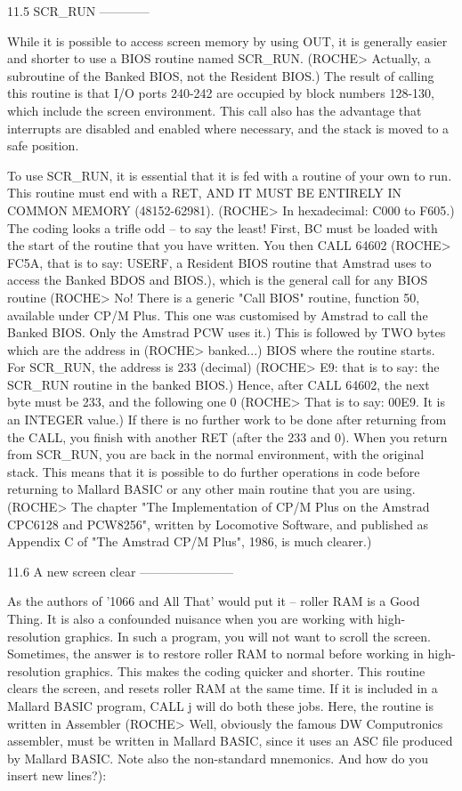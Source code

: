 11.5 SCR_RUN
------------

While  it  is possible to access screen memory by using OUT, it  is  generally 
easier  and shorter to use a BIOS routine named SCR_RUN. (ROCHE>  Actually,  a 
subroutine  of the Banked BIOS, not the Resident BIOS.) The result of  calling 
this routine is that I/O ports 240-242 are occupied by block numbers  128-130, 
which  include the screen environment. This call also has the  advantage  that 
interrupts are disabled and enabled where necessary, and the stack is moved to 
a safe position.

To  use SCR_RUN, it is essential that it is fed with a routine of your own  to 
run.  This  routine  must end with a RET, AND IT MUST BE  ENTIRELY  IN  COMMON 
MEMORY (48152-62981). (ROCHE> In hexadecimal: C000 to F605.) The coding  looks 
a  trifle odd -- to say the least! First, BC must be loaded with the start  of 
the  routine that you have written. You then CALL 64602 (ROCHE> FC5A, that  is 
to say: USERF, a Resident BIOS routine that Amstrad uses to access the  Banked 
BDOS  and BIOS.), which is the general call for any BIOS routine  (ROCHE>  No! 
There  is  a generic "Call BIOS" routine, function 50,  available  under  CP/M 
Plus.  This  one was customised by Amstrad to call the Banked BIOS.  Only  the 
Amstrad  PCW uses it.) This is followed by TWO bytes which are the address  in 
(ROCHE> banked...) BIOS where the routine starts. For SCR_RUN, the address  is 
233  (decimal) (ROCHE> E9: that is to say: the SCR_RUN routine in  the  banked 
BIOS.)  Hence, after CALL 64602, the next byte must be 233, and the  following 
one  0 (ROCHE> That is to say: 00E9. It is an INTEGER value.) If there  is  no 
further work to be done after returning from the CALL, you finish with another 
RET  (after the 233 and 0). When you return from SCR_RUN, you are back in  the 
normal environment, with the original stack. This means that it is possible to 
do  further operations in code before returning to Mallard BASIC or any  other 
main  routine that you are using. (ROCHE> The chapter "The  Implementation  of 
CP/M Plus on the Amstrad CPC6128 and PCW8256", written by Locomotive Software, 
and  published  as  Appendix  C of "The Amstrad  CP/M  Plus",  1986,  is  much 
clearer.)


11.6 A new screen clear
-----------------------

As  the  authors of '1066 and All That' would put it -- roller RAM is  a  Good 
Thing.  It  is  also a confounded nuisance when you  are  working  with  high-
resolution  graphics.  In  such a program, you will not  want  to  scroll  the 
screen.  Sometimes,  the  answer is to restore roller  RAM  to  normal  before 
working  in  high-resolution  graphics.  This makes  the  coding  quicker  and 
shorter.  This  routine clears the screen, and resets roller RAM at  the  same 
time. If it is included in a Mallard BASIC program, CALL j will do both  these 
jobs.  Here, the routine is written in Assembler (ROCHE> Well,  obviously  the 
famous  DW Computronics assembler, must be written in Mallard BASIC, since  it 
uses  an  ASC  file  produced by Mallard BASIC.  Note  also  the  non-standard 
mnemonics. And how do you insert new lines?):

